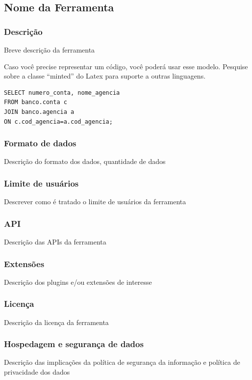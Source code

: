 \documentclass[12pt]{article}
\begin{document}
\subsection{Nome da Ferramenta}

\subsubsection{Descrição}
Breve descrição da ferramenta

Caso você precise representar um código, você poderá usar esse modelo. Pesquise sobre a classe ``minted'' do Latex para suporte a outras linguagens.

\begin{verbatim}
SELECT numero_conta, nome_agencia 
FROM banco.conta c 
JOIN banco.agencia a 
ON c.cod_agencia=a.cod_agencia;
\end{verbatim}

\subsubsection{Formato de dados}
Descrição do formato dos dados, quantidade de dados

\subsubsection{Limite de usuários}
Descrever como é tratado o limite de usuários da ferramenta

\subsubsection{API}
Descrição das APIs da ferramenta

\subsubsection{Extensões}
Descrição dos plugins e/ou extensões de interesse

\subsubsection{Licença}
Descrição da licença da ferramenta

\subsubsection{Hospedagem e segurança de dados}
Descrição das implicações da política de segurança da informação e política de privacidade dos dados
\end{document}
